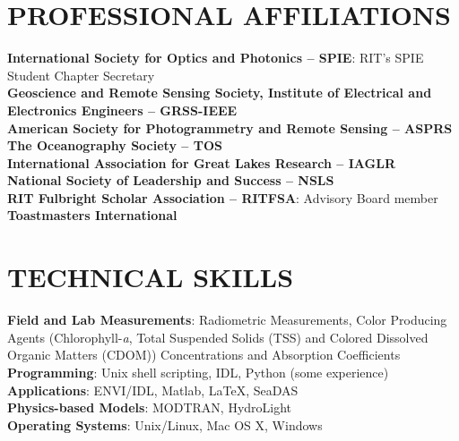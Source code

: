 \documentclass[11pt]{res} %
\begin{document}
\begin{resume}
\section{PROFESSIONAL AFFILIATIONS}
\vspace{0.1in}
{\bf International Society for Optics and Photonics -- SPIE}: RIT's SPIE Student Chapter Secretary 
\vspace{0.1in}\\
{\bf Geoscience and Remote Sensing Society, Institute of Electrical and Electronics Engineers -- GRSS-IEEE}
\vspace{0.1in}\\
{\bf American Society for Photogrammetry and Remote Sensing -- ASPRS}
\vspace{0.1in}\\
{\bf The Oceanography Society -- TOS}
\vspace{0.1in}\\
{\bf International Association for Great Lakes Research -- IAGLR}
\vspace{0.1in}\\
{\bf National Society of Leadership and Success -- NSLS}
\vspace{0.1in}\\
{\bf RIT Fulbright Scholar Association -- RITFSA}: Advisory Board member
\vspace{0.1in}\\
{\bf Toastmasters International}

\section{TECHNICAL SKILLS}
\vspace{0.1in}
{\bf Field and Lab Measurements}: Radiometric Measurements, Color Producing Agents (Chlorophyll-{\it a}, Total Suspended Solids (TSS) and Colored Dissolved Organic Matters (CDOM)) Concentrations and Absorption Coefficients
\vspace{0.1in}\\
{\bf Programming}: Unix shell scripting, IDL, Python (some experience)
\vspace{0.1in}\\
{\bf Applications}: ENVI/IDL, Matlab, LaTeX, SeaDAS
\vspace{0.1in}\\
{\bf Physics-based Models}: MODTRAN, HydroLight
\vspace{0.1in}\\
{\bf Operating Systems}: Unix/Linux, Mac OS X, Windows\\



\end{resume}
\end{document}
